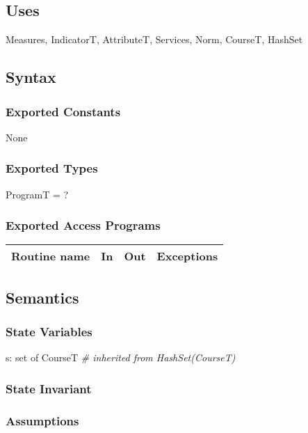 \documentclass[12pt]{article}
\begin{document}
\subsection* {Uses}

Measures, IndicatorT, AttributeT, Services, Norm, CourseT, HashSet

\subsection* {Syntax}

\subsubsection* {Exported Constants}

None

\subsubsection* {Exported Types}

ProgramT = ?

\subsubsection* {Exported Access Programs}

\begin{tabular}{| l | l | l | p{5cm} |}
  \hline
  \textbf{Routine name} & \textbf{In} & \textbf{Out} & \textbf{Exceptions}\\
  \hline
  \hline
  
\end{tabular}

\subsection* {Semantics}

\subsubsection* {State Variables}

s: set of CourseT \textit{\# inherited from HashSet(CourseT)}

\subsubsection* {State Invariant}

\subsubsection* {Assumptions}
\end{document}
